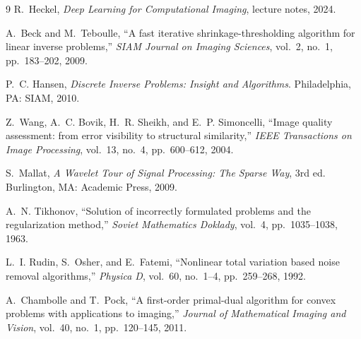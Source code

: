 \documentclass[11pt,a4paper]{article}
\begin{document}
\begin{thebibliography}{9}
\small
{}
R.~Heckel, \emph{Deep Learning for Computational Imaging}, lecture notes, 2024.

A.~Beck and M.~Teboulle, ``A fast iterative shrinkage-thresholding algorithm for linear inverse
problems,'' \emph{SIAM Journal on Imaging Sciences}, vol.~2, no.~1, pp.~183--202, 2009.

P.~C. Hansen, \emph{Discrete Inverse Problems: Insight and Algorithms}. Philadelphia, PA: SIAM,
2010.

Z.~Wang, A.~C. Bovik, H.~R. Sheikh, and E.~P. Simoncelli, ``Image quality assessment: from error
visibility to structural similarity,'' \emph{IEEE Transactions on Image Processing}, vol.~13,
no.~4, pp.~600--612, 2004.

S.~Mallat, \emph{A Wavelet Tour of Signal Processing: The Sparse Way}, 3rd ed. Burlington, MA:
Academic Press, 2009.

A.~N. Tikhonov, ``Solution of incorrectly formulated problems and the regularization method,''
\emph{Soviet Mathematics Doklady}, vol.~4, pp.~1035--1038, 1963.

L.~I. Rudin, S.~Osher, and E.~Fatemi, ``Nonlinear total variation based noise removal
algorithms,'' \emph{Physica D}, vol.~60, no.~1--4, pp.~259--268, 1992.

A.~Chambolle and T.~Pock, ``A first-order primal-dual algorithm for convex problems with
applications to imaging,'' \emph{Journal of Mathematical Imaging and Vision}, vol.~40, no.~1,
pp.~120--145, 2011.
\end{thebibliography}
\end{document}
